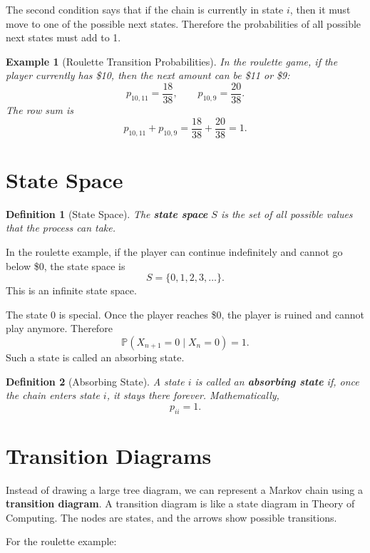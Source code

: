 \documentclass[12pt,a4paper]{article}
\theoremstyle{lecturestyle}
\newtheorem{definition}{Definition}
\newtheorem{example}{Example}
\newcommand{\Prob}{\mathbb{P}}
\begin{document}
The second condition says that if the chain is currently in state $i$, then it must move to one of the possible next states. Therefore the probabilities of all possible next states must add to 1.

\begin{example}[Roulette Transition Probabilities]
In the roulette game, if the player currently has \$10, then the next amount can be \$11 or \$9:
\[
p_{10,11}=\frac{18}{38}, \qquad p_{10,9}=\frac{20}{38}.
\]
The row sum is
\[
p_{10,11}+p_{10,9}
=\frac{18}{38}+\frac{20}{38}
=1.
\]
\end{example}

\section{State Space}

\begin{definition}[State Space]
The \textbf{state space} $S$ is the set of all possible values that the process can take.
\end{definition}

In the roulette example, if the player can continue indefinitely and cannot go below \$0, the state space is
\[
S=\{0,1,2,3,\ldots\}.
\]
This is an infinite state space.

The state $0$ is special. Once the player reaches \$0, the player is ruined and cannot play anymore. Therefore
\[
\Prob(X_{n+1}=0\mid X_n=0)=1.
\]
Such a state is called an absorbing state.

\begin{definition}[Absorbing State]
A state $i$ is called an \textbf{absorbing state} if, once the chain enters state $i$, it stays there forever. Mathematically,
\[
p_{ii}=1.
\]
\end{definition}

\section{Transition Diagrams}

Instead of drawing a large tree diagram, we can represent a Markov chain using a \textbf{transition diagram}. A transition diagram is like a state diagram in Theory of Computing. The nodes are states, and the arrows show possible transitions.

For the roulette example:
\end{document}
